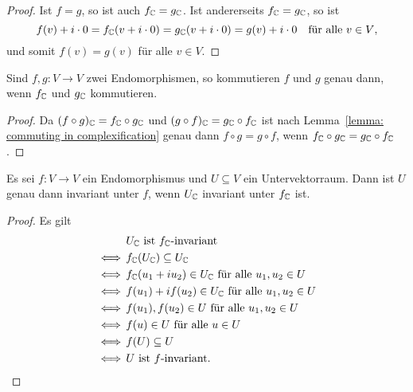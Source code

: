 \documentclass[a4paper,10pt]{article}
\begin{document}
\begin{proof}
  Ist $f = g$, so ist auch $f_{\mathbb{C}} = g_{\mathbb{C}}$.
  Ist andererseits $f_{\mathbb{C}} = g_{\mathbb{C}}$, so ist
  \[
    f(v) + i \cdot 0
    = f_{\mathbb{C}}(v + i \cdot 0)
    = g_{\mathbb{C}}(v + i \cdot 0)
    = g(v) + i \cdot 0
    \quad
    \text{für alle $v \in V$},
  \]
  und somit $f(v) = g(v)$ für alle $v \in V$.
\end{proof}


\begin{corollary}
  Sind $f, g \colon V \to V$ zwei Endomorphismen, so kommutieren $f$ und $g$ genau dann, wenn $f_{\mathbb{C}}$ und $g_{\mathbb{C}}$ kommutieren.
\end{corollary}


\begin{proof}
  Da $(f \circ g)_{\mathbb{C}} = f_{\mathbb{C}} \circ g_{\mathbb{C}}$ und $(g \circ f)_{\mathbb{C}} = g_{\mathbb{C}} \circ f_{\mathbb{C}}$ ist nach Lemma~\ref{lemma: commuting in complexification} genau dann $f \circ g = g \circ f$, wenn $f_{\mathbb{C}} \circ g_{\mathbb{C}} = g_{\mathbb{C}} \circ f_{\mathbb{C}}$.
\end{proof}


\begin{lemma}\label{lem: invariance of induced subspaces}
  Es sei $f \colon V \to V$ ein Endomorphismus und $U \subseteq V$ ein Untervektorraum.
  Dann ist $U$ genau dann invariant unter $f$, wenn $U_{\mathbb{C}}$ invariant unter $f_{\mathbb{C}}$ ist.
\end{lemma}


\begin{proof}
  Es gilt
  \begin{align*}
        &\, \text{$U_{\mathbb{C}}$ ist $f_{\mathbb{C}}$-invariant}                            \\
    \iff&\, f_{\mathbb{C}}(U_{\mathbb{C}}) \subseteq U_{\mathbb{C}}                                   \\
    \iff&\, \text{$f_{\mathbb{C}}(u_1 + i u_2) \in U_{\mathbb{C}}$ für alle $u_1, u_2 \in U$} \\
    \iff&\, \text{$f(u_1) + i f(u_2) \in U_{\mathbb{C}}$ für alle $u_1, u_2 \in U$}   \\
    \iff&\, \text{$f(u_1), f(u_2) \in U$ für alle $u_1, u_2 \in U$}           \\
    \iff&\, \text{$f(u) \in U$ für alle $u \in U$}                            \\
    \iff&\, f(U) \subseteq U                                                  \\
    \iff&\, \text{$U$ ist $f$-invariant}.
    \qedhere
  \end{align*}
\end{proof}
\end{document}
